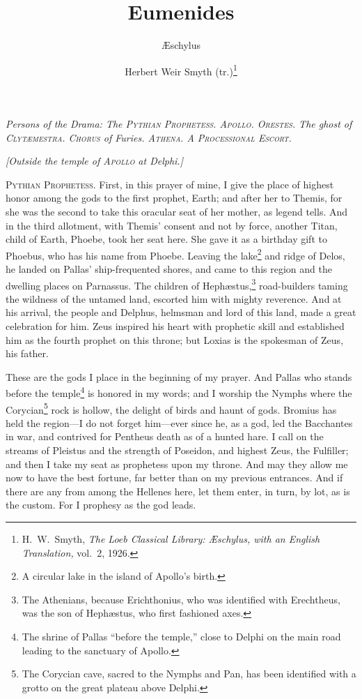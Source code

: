 \documentclass[12pt]{article}
\title{Eumenides}
\author{{\AE}schylus \and Herbert Weir Smyth (tr.)\footnote{H.~W.~Smyth, \textit{The Loeb Classical Library: {\AE}schylus, with an English Translation,} vol.~2, 1926.}}
\date{}
\begin{document}
\maketitle

\begin{center}
\textit{Persons of the Drama: The \textsc{Pythian Prophetess. Apollo. Orestes.} The ghost of \textsc{Clyt{\ae}mestra. Chorus} of Furies. \textsc{Athena.} A \textsc{Processional Escort.}}
\end{center}

\begin{center}
\textit{[Outside the temple of \textsc{Apollo} at Delphi.]}
\end{center}

\noindent \textsc{Pythian Prophetess.} First, in this prayer of mine, I give the place of highest honor among the gods to the first prophet, Earth; and after her to Themis, for she was the second to take this oracular seat of her mother, as legend tells. And in the third allotment, with Themis' consent and not by force, another Titan, child of Earth, Phoebe, took her seat here. She gave it as a birthday gift to Phoebus, who has his name from Phoebe. Leaving the lake\footnote{A circular lake in the island of Apollo's birth.} and ridge of Delos, he landed on Pallas' ship-frequented shores, and came to this region and the dwelling places on Parnassus. The children of Heph{\ae}stus,\footnote{The Athenians, because Erichthonius, who was identified with Erechtheus, was the son of Heph{\ae}stus, who first fashioned axes.} road-builders taming the wildness of the untamed land, escorted him with mighty reverence. And at his arrival, the people and Delphus, helmsman and lord of this land, made a great celebration for him. Zeus inspired his heart with prophetic skill and established him as the fourth prophet on this throne; but Loxias is the spokesman of Zeus, his father.

These are the gods I place in the beginning of my prayer. And Pallas who stands before the temple\footnote{The shrine of Pallas ``before the temple,'' close to Delphi on the main road leading to the sanctuary of Apollo.} is honored in my words; and I worship the Nymphs where the Corycian\footnote{The Corycian cave, sacred to the Nymphs and Pan, has been identified with a grotto on the great plateau above Delphi.} rock is hollow, the delight of birds and haunt of gods. Bromius has held the region---I do not forget him---ever since he, as a god, led the Bacchantes in war, and contrived for Pentheus death as of a hunted hare. I call on the streams of Pleistus and the strength of Poseidon, and highest Zeus, the Fulfiller; and then I take my seat as prophetess upon my throne. And may they allow me now to have the best fortune, far better than on my previous entrances. And if there are any from among the Hellenes here, let them enter, in turn, by lot, as is the custom. For I prophesy as the god leads.
\end{document}
